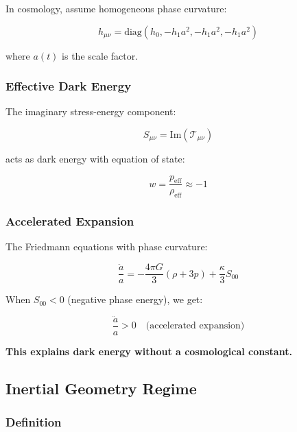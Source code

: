 In cosmology, assume homogeneous phase curvature:

\begin{equation}
h_{\mu\nu} = \text{diag}(h_0, -h_1 a^2, -h_1 a^2, -h_1 a^2)
\end{equation}

where $a(t)$ is the scale factor.

\subsubsection{Effective Dark Energy}

The imaginary stress-energy component:

\begin{equation}
S_{\mu\nu} = \text{Im}(\mathcal{T}_{\mu\nu})
\end{equation}

acts as dark energy with equation of state:

\begin{equation}
w = \frac{p_{\text{eff}}}{\rho_{\text{eff}}} \approx -1
\end{equation}

\subsubsection{Accelerated Expansion}

The Friedmann equations with phase curvature:

\begin{equation}
\frac{\ddot{a}}{a} = -\frac{4\pi G}{3}(\rho + 3p) + \frac{\kappa}{3} S_{00}
\end{equation}

When $S_{00} < 0$ (negative phase energy), we get:

\begin{equation}
\frac{\ddot{a}}{a} > 0 \quad \text{(accelerated expansion)}
\end{equation}

\textbf{This explains dark energy without a cosmological constant.}

\subsection{Inertial Geometry Regime}

\subsubsection{Definition}

